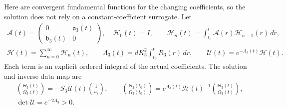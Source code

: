 Here are convergent fundamental functions for the changing coefficients,
so the solution does not rely on a constant-coefficient surrogate.
Let
\begin{equation}\label{tg:fundamental}
 \begin{gathered}
 \mathcal A(t)=\begin{pmatrix}0&\mathfrak a_3(t)\\
                              \mathfrak b_3(t)&0\end{pmatrix},\quad
 \mathcal H_0(t)=I,\qquad
 \mathcal H_n(t)=\int_{t_0}^t\mathcal A(r)\mathcal H_{n-1}(r)\,dr,\\
 \mathcal H(t)=\sum_{n=0}^\infty\mathcal H_n(t),\qquad
 \Lambda_3(t)=dK_3^2\int_{t_0}^tR_3(r)\,dr,\qquad
 \mathcal U(t)=e^{-\Lambda_3(t)}\mathcal H(t).
 \end{gathered}
\end{equation}
Each term is an explicit ordered integral of the actual coefficients.
The solution and inverse-data map are
\begin{equation}\label{tg:fundamental_inverse}
\begin{gathered}
 \binom{\Theta_3(t)}{\Omega_3(t)}
       =-S_3\mathcal U(t)\binom1{u_i},\qquad
 \binom{\Theta_3(t_0)}{\Omega_3(t_0)}
       =e^{\Lambda_3(t)}\mathcal H(t)^{-1}
                         \binom{\Theta_3(t)}{\Omega_3(t)},\\
 \det\mathcal U=e^{-2\Lambda_3}>0.
\end{gathered}
\end{equation}

